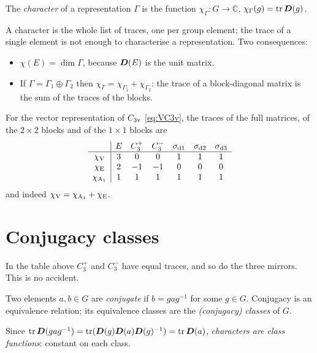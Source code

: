 \begin{definition}
The \emph{character} of a representation $\Gamma$ is the function
$\chi_\Gamma\colon G\to\mathbb{C}$, $\chi_\Gamma(g)=\operatorname{tr}\bm{D}(g)$.
\end{definition}
A character is the whole list of traces, one per group element; the trace of a
single element is not enough to characterise a representation. Two consequences:
\begin{itemize}
\item $\chi(E)=\dim\Gamma$, because $\bm{D}(E)$ is the unit matrix.
\item If $\Gamma=\Gamma_1\oplus\Gamma_2$ then $\chi_\Gamma=\chi_{\Gamma_1}+\chi_{\Gamma_2}$:
      the trace of a block-diagonal matrix is the sum of the traces of the blocks.
\end{itemize}
For the vector representation of $C_{3\mathrm{v}}$ \eqref{eq:VC3v}, the traces of the full
matrices, of the $2\times2$ blocks and of the $1\times1$ blocks are
\[
\begin{array}{c|cccccc}
 & E & C_3^+ & C_3^- & \sigma_{\mathrm{d}1} & \sigma_{\mathrm{d}2} & \sigma_{\mathrm{d}3}\\\hline
\chi_{\mathrm{V}} & 3 & 0 & 0 & 1 & 1 & 1\\
\chi_{\mathrm{E}} & 2 & -1 & -1 & 0 & 0 & 0\\
\chi_{\mathrm{A}_1} & 1 & 1 & 1 & 1 & 1 & 1
\end{array}
\]
and indeed $\chi_{\mathrm{V}}=\chi_{\mathrm{A}_1}+\chi_{\mathrm{E}}$.

\section{Conjugacy classes}

In the table above $C_3^+$ and $C_3^-$ have equal traces, and so do the three mirrors.
This is no accident.

\begin{definition}
Two elements $a,b\in G$ are \emph{conjugate} if $b=g a g^{-1}$ for some $g\in G$.
Conjugacy is an equivalence relation; its equivalence classes are the
\emph{(conjugacy) classes} of $G$.
\end{definition}
Since $\operatorname{tr}\bm{D}(gag^{-1})=\operatorname{tr}(\bm{D}(g)\bm{D}(a)\bm{D}(g)^{-1})=\operatorname{tr}\bm{D}(a)$,
\emph{characters are class functions}: constant on each class.

